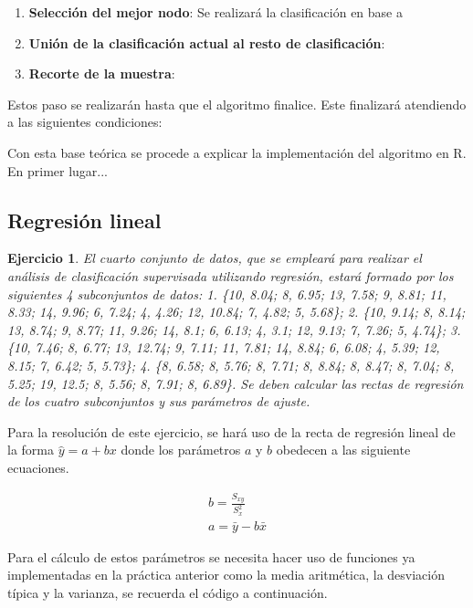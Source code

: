 \documentclass[12pt]{report}\usepackage[]{graphicx}\usepackage[dvipsnames]{xcolor}
\newtheorem{exercise}{Ejercicio}[section]
\begin{document}
 				\begin{enumerate}
 					\item \textbf{Selección del mejor nodo}: Se realizará la clasificación en base a 
 					\item \textbf{Unión de la clasificación actual al resto de clasificación}:
 					\item \textbf{Recorte de la muestra}:
 				\end{enumerate}
 				
 				Estos paso se realizarán hasta que el algoritmo finalice. Este finalizará atendiendo a las siguientes condiciones:
 				
 				
 				Con esta base teórica se procede a explicar la implementación del algoritmo en R. En primer lugar...
 			\subsection{Regresión lineal}
 			
 				\begin{exercise}
 					El cuarto conjunto de datos, que se empleará para realizar el análisis de clasificación supervisada utilizando regresión, estará formado por los siguientes 4 subconjuntos de datos: 1. \{10, 8.04; 8, 6.95; 13, 7.58; 9, 8.81; 11, 8.33; 14, 9.96; 6, 7.24; 4, 4.26; 12, 10.84; 7, 4.82; 5, 5.68\}; 2. \{10, 9.14; 8, 8.14; 13, 8.74; 9, 8.77; 11, 9.26; 14, 8.1; 6, 6.13; 4, 3.1; 12, 9.13; 7, 7.26; 5, 4.74\}; 3. \{10, 7.46; 8, 6.77; 13, 12.74; 9, 7.11; 11, 7.81; 14, 8.84; 6, 6.08; 4, 5.39; 12, 8.15; 7, 6.42; 5, 5.73\}; 4. \{8, 6.58; 8, 5.76; 8, 7.71; 8, 8.84; 8, 8.47; 8, 7.04; 8, 5.25; 19, 12.5; 8, 5.56; 8, 7.91; 8, 6.89\}. Se deben calcular las rectas de regresión de los cuatro subconjuntos y sus parámetros de ajuste.
 				\end{exercise}
 				
 				Para la resolución de este ejercicio, se hará uso de la recta de regresión lineal de la forma $\hat{y} = a + bx$ donde los parámetros $a$ y $b$ obedecen a las siguiente ecuaciones. 
 				
 				\begin{equation}\label{ec:reg_param}
 					\begin{gathered}
 						b = \frac{S_{xy}}{S^2_x}\\
 						a = \bar{y} - b \bar{x}
 					\end{gathered}
 				\end{equation}
 				
 				Para el cálculo de estos parámetros se necesita hacer uso de funciones ya implementadas en la práctica anterior como la media aritmética, la desviación típica y la varianza, se recuerda el código a continuación. 
 				
\end{document}
